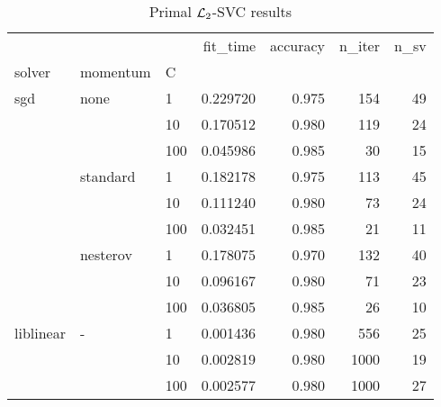 \begin{table}[H]
\centering
\caption{Primal $\protect \mathcal{L}_2$-SVC results}
\label{primal_l2_svc_cv_results}
\begin{tabular}{lllrrrr}
\toprule
          &   &     &  fit\_time &  accuracy &  n\_iter &  n\_sv \\
solver & momentum & C &           &           &         &       \\
\midrule
sgd & none & 1   &  0.229720 &     0.975 &     154 &    49 \\
          &   & 10  &  0.170512 &     0.980 &     119 &    24 \\
          &   & 100 &  0.045986 &     0.985 &      30 &    15 \\
          & standard & 1   &  0.182178 &     0.975 &     113 &    45 \\
          &   & 10  &  0.111240 &     0.980 &      73 &    24 \\
          &   & 100 &  0.032451 &     0.985 &      21 &    11 \\
          & nesterov & 1   &  0.178075 &     0.970 &     132 &    40 \\
          &   & 10  &  0.096167 &     0.980 &      71 &    23 \\
          &   & 100 &  0.036805 &     0.985 &      26 &    10 \\
liblinear & - & 1   &  0.001436 &     0.980 &     556 &    25 \\
          &   & 10  &  0.002819 &     0.980 &    1000 &    19 \\
          &   & 100 &  0.002577 &     0.980 &    1000 &    27 \\
\bottomrule
\end{tabular}
\end{table}
